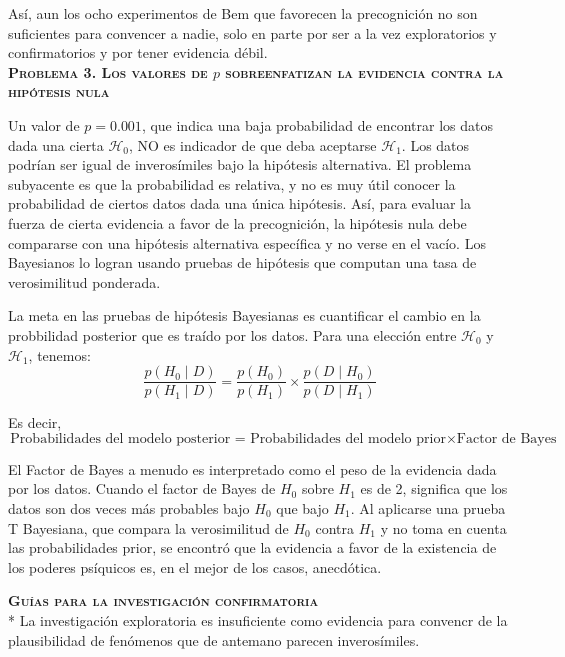 \documentclass[a4paper,12pt]{article}
\begin{document}
Así, aun los ocho experimentos de Bem que favorecen la precognición no son suficientes para convencer a nadie, solo en parte por ser a la vez exploratorios y confirmatorios y por tener evidencia débil.\\

{\scshape\bfseries Problema 3. Los valores de $p$ sobreenfatizan la evidencia contra la hipótesis nula}

Un valor de $p = 0{.}001$, que indica una baja probabilidad de encontrar los datos dada una cierta $\mathcal H_0$, NO es indicador de que deba aceptarse $\mathcal H_1$. Los datos podrían ser igual de inverosímiles bajo la hipótesis alternativa. El problema subyacente es que la probabilidad es relativa, y no es muy útil conocer la probabilidad de ciertos datos dada una única hipótesis. Así, para evaluar la fuerza de cierta evidencia a favor de la precognición, la hipótesis nula debe compararse con una hipótesis alternativa específica y no verse en el vacío. Los Bayesianos lo logran usando pruebas de hipótesis que computan una tasa de verosimilitud ponderada.

La meta en las pruebas de hipótesis Bayesianas es cuantificar el cambio en la  probbilidad posterior que es traído por los datos. Para una elección entre $\mathcal H_0$ y $\mathcal H_1$, tenemos:
$$\frac{p\left(H_{0} \mid D\right)}{p\left(H_{1} \mid D\right)}=\frac{p\left(H_{0}\right)}{p\left(H_{1}\right)} \times \frac{p\left(D \mid H_{0}\right)}{p\left(D \mid H_{1}\right)}$$

Es decir, $$\mbox{Probabilidades del modelo posterior = Probabilidades del modelo prior} \times \mbox{Factor de Bayes}$$

El Factor de Bayes a menudo es interpretado como el peso de la evidencia dada por los datos. Cuando el factor de Bayes de $H_0$ sobre $H_1$ es de 2, significa que los datos son dos veces más probables bajo $H_0$ que bajo $H_1$. Al aplicarse una prueba T Bayesiana, que compara la verosimilitud de $H_0$ contra $H_1$ y no toma en cuenta las probabilidades prior, se encontró que la evidencia a favor de la existencia de los poderes psíquicos es, en el mejor de los casos, anecdótica. 

{\scshape\bfseries Guías para la investigación confirmatoria}\\*
La investigación exploratoria es insuficiente como evidencia para convencr de la plausibilidad de fenómenos que de antemano parecen inverosímiles. 
\end{document}
